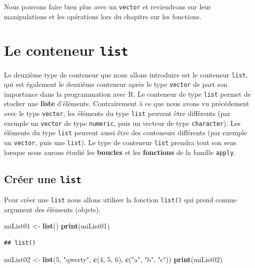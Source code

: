 \documentclass[]{book}
\newenvironment{Shaded}{\begin{snugshade}}{\end{snugshade}}
\newcommand{\KeywordTok}[1]{\textcolor[rgb]{0.13,0.29,0.53}{\textbf{#1}}}
\newcommand{\DecValTok}[1]{\textcolor[rgb]{0.00,0.00,0.81}{#1}}
\newcommand{\StringTok}[1]{\textcolor[rgb]{0.31,0.60,0.02}{#1}}
\newcommand{\NormalTok}[1]{#1}
\begin{document}
Nous pouvons faire bien plus avec un \texttt{vector} et reviendrons sur
leur manipulations et les opérations lors du chapitre sur les fonctions.

\section{\texorpdfstring{Le conteneur
\texttt{list}}{Le conteneur list}}\label{le-conteneur-list}

Le deuxième type de conteneur que nous allons introduire est le
conteneur \texttt{list}, qui est également le deuxième conteneur après
le type \texttt{vector} de part son importance dans la programmation
avec R. Le conteneur de type \texttt{list} permet de stocker une
\textbf{liste} d'éléments. Contrairement à ce que nous avons vu
précédement avec le type \texttt{vector}, les éléments du type
\texttt{list} peuvent être différents (par exemple un \texttt{vector} de
type \texttt{numeric}, puis un vecteur de type \texttt{character}). Les
éléments du type \texttt{list} peuvent aussi être des conteneurs
différents (par exemple un \texttt{vector}, puis une \texttt{list}). Le
type de conteneur \texttt{list} prendra tout son sens lorsque nous
aurons étudié les \textbf{boucles} et les \textbf{fonctions} de la
famille \texttt{apply}.

\subsection{\texorpdfstring{Créer une
\texttt{list}}{Créer une list}}\label{creer-une-list}

Pour créer une \texttt{list} nous allons utiliser la fonction
\texttt{list()} qui prend comme argument des éléments (objets).

\begin{Shaded}
\begin{Highlighting}[]
\NormalTok{miList01 <-}\StringTok{ }\KeywordTok{list}\NormalTok{()}
\KeywordTok{print}\NormalTok{(miList01)}
\end{Highlighting}
\end{Shaded}

\begin{verbatim}
## list()
\end{verbatim}

\begin{Shaded}
\begin{Highlighting}[]
\NormalTok{miList02 <-}\StringTok{ }\KeywordTok{list}\NormalTok{(}\DecValTok{5}\NormalTok{, }\StringTok{"qwerty"}\NormalTok{, }\KeywordTok{c}\NormalTok{(}\DecValTok{4}\NormalTok{, }\DecValTok{5}\NormalTok{, }\DecValTok{6}\NormalTok{), }\KeywordTok{c}\NormalTok{(}\StringTok{"a"}\NormalTok{, }\StringTok{"b"}\NormalTok{, }\StringTok{"c"}\NormalTok{))}
\KeywordTok{print}\NormalTok{(miList02)}
\end{Highlighting}
\end{Shaded}
\end{document}
